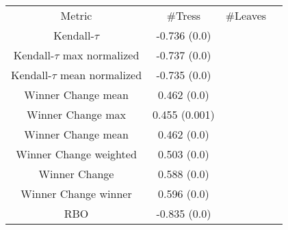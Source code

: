 \begin{tabular}{c|c|c|c} 
Metric & #Tress & #Leaves \\ 
Kendall-$\tau$ & -0.736 (0.0)   \\ 
Kendall-$\tau$ max normalized & -0.737 (0.0)  \\ 
Kendall-$\tau$ mean normalized & -0.735 (0.0)  \\ 
Winner Change mean& 0.462 (0.0) &  \\ 
Winner Change max & 0.455 (0.001) \\ 
Winner Change mean & 0.462 (0.0) &  \\ 
Winner Change weighted & 0.503 (0.0) \\ 
Winner Change & 0.588 (0.0) \\ 
Winner Change winner & 0.596 (0.0)  \\ 
RBO & -0.835 (0.0) \\ 
\end{tabular}